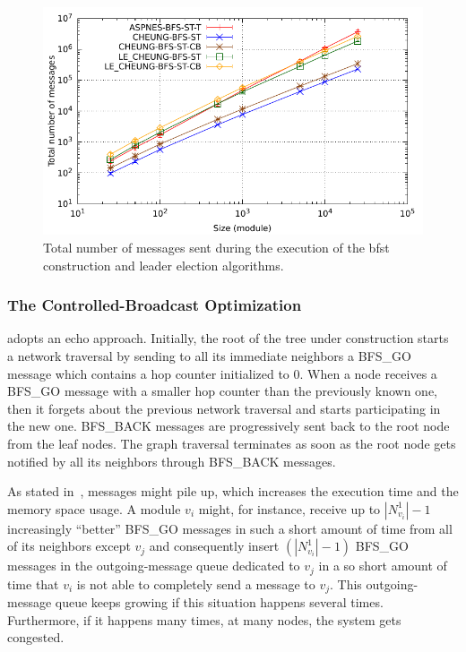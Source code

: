 \begin{figure}[!h]
	\centering
	\includegraphics[width=\gnuplotGraphWidth]{images/centrality/ub/messages}
	\caption{Total number of messages sent during the execution of the \gls{bfst} construction and leader election algorithms.}
	\label{fig:centrality:bfs-messages}
\end{figure}

\subsubsection{The Controlled-Broadcast Optimization}
\label{section:centrality-controlled-broadcast}

\cheung{} adopts an echo approach. Initially, the root of the tree under construction starts a network traversal by sending to all its immediate neighbors a BFS\_GO message which contains a hop counter initialized to 0. When a node receives a \mbox{BFS\_GO} message with a smaller hop counter than the previously known one, then it forgets about the previous network traversal and starts participating in the new one. BFS\_BACK messages are progressively sent back to the root node from the leaf nodes. The graph traversal terminates as soon as the root node gets notified by all its neighbors through BFS\_BACK messages.

As stated in~\cite{lynch1996distributed}, messages might pile up, which increases the execution time and the memory space usage. A module $v_i$ might, for instance, receive up to $|N_{v_i}^1|-1$ increasingly ``better'' BFS\_GO messages in such a short amount of time from all of its neighbors except $v_j$ and consequently insert $(|N_{v_i}^1|-1)$ BFS\_GO messages in the outgoing-message queue dedicated to $v_j$ in a so short amount of time that $v_i$ is not able to completely send a message to $v_j$. This outgoing-message queue keeps growing if this situation happens several times. Furthermore, if it happens many times, at many nodes, the system gets congested.

